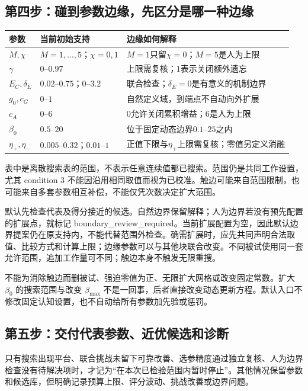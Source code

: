 \documentclass[11pt]{article}
\begin{document}
\subsection{第四步：碰到参数边缘，先区分是哪一种边缘}
\begin{center}\small
\begin{tabularx}{\linewidth}{l l X}
\toprule
参数 & 当前初始支持 & 边缘如何解释\\
\midrule
$M,\chi$ & $M=1,\ldots,5$；$\chi=0,1$ & $M=1$只留$\chi=0$；$M=5$是人为上限\\
$\gamma$ & $0$--$0.97$ & 上限需复核；$1$表示关闭额外遗忘\\
$E_C,\delta_E$ & $0.02$--$0.75$；$0$--$3.2$ & 联合检查；$\delta_E=0$是有意义的机制边界\\
$g_0,c_G$ & $0$--$1$ & 自然定义域，到端点不自动向外扩展\\
$c_A$ & $0$--$6$ & $0$允许关闭累积增益；$6$是人为上限\\
$\beta_0$ & $0.5$--$20$ & 位于固定动态边界$0.1$--$25$之内\\
$\eta_+,\eta_-$ & $0.005$--$0.32$；$0.01$--$1$ & 正值下限与$\eta_+$上限需复核；零值另定义消融\\
\bottomrule
\end{tabularx}
\end{center}

表中是离散搜索表的范围，不表示任意连续值都已搜索。范围仍是共同工作设置，尤其 condition 3 不能因沿用相同取值而视为已校准。触边可能来自范围限制，也可能来自多套参数相互补偿，不能仅凭次数决定扩大范围。

默认先检查代表及得分接近的候选。自然边界保留解释；人为边界若没有预先配置的扩展点，就标记 boundary\_review\_required。当前扩展配置为空，因此默认边界提案仍在原支持内，不能代替范围外检查。确需扩展时，应先共同声明合法取值、比较方式和计算上限；边缘参数可以与其他块联合改变。不同被试使用同一套允许范围，追加工作量可不同；触边本身不触发无限重搜。

不能为消除触边而删被试、强迫零值为正、无限扩大网格或改变固定常数。扩大 $\beta_0$ 的搜索范围与改变 $\beta_{\max}$ 不是一回事，后者直接改变动态更新方程。默认入口不修改固定认知设置，也不自动给所有参数加先验或惩罚。

\subsection{第五步：交付代表参数、近优候选和诊断}
只有搜索出现平台、联合挑战未留下可靠改善、选参精度通过独立复核、人为边界检查没有待解决项时，才记为“在本次已检验范围内暂时停止”。其他情况保留参数和候选库，但明确记录预算上限、评分波动、挑战改善或边界问题。
\end{document}
